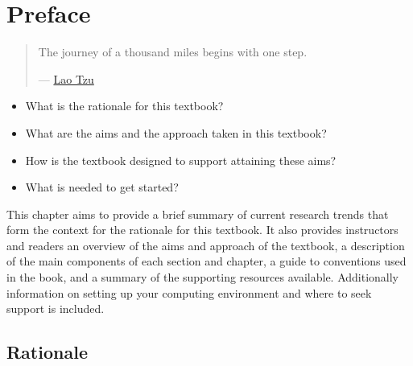 \documentclass[
  letterpaper,
]{latex/krantz}
\providecommand{\tightlist}{%
  \setlength{\itemsep}{0pt}\setlength{\parskip}{0pt}}\usepackage{longtable,booktabs,array}
\begin{document}

\hypertarget{sec-preface}{%
\chapter*{Preface}\label{sec-preface}}


\begin{quote}
The journey of a thousand miles begins with one step.

--- \href{https://en.wikipedia.org/wiki/Laozi}{Lao Tzu}
\end{quote}

\begin{tcolorbox}[enhanced jigsaw, toprule=.15mm, bottomtitle=1mm, coltitle=black, title=\textcolor{quarto-callout-note-color}{\faInfo}\hspace{0.5em}{Keys}, left=2mm, colframe=quarto-callout-note-color-frame, bottomrule=.15mm, colbacktitle=quarto-callout-note-color!10!white, leftrule=.75mm, colback=white, titlerule=0mm, breakable, toptitle=1mm, opacityback=0, arc=.35mm, rightrule=.15mm, opacitybacktitle=0.6]

\begin{itemize}
\tightlist
\item
  What is the rationale for this textbook?
\item
  What are the aims and the approach taken in this textbook?
\item
  How is the textbook designed to support attaining these aims?
\item
  What is needed to get started?
\end{itemize}

\end{tcolorbox}

This chapter aims to provide a brief summary of current research trends
that form the context for the rationale for this textbook. It also
provides instructors and readers an overview of the aims and approach of
the textbook, a description of the main components of each section and
chapter, a guide to conventions used in the book, and a summary of the
supporting resources available. Additionally information on setting up
your computing environment and where to seek support is included.

\hypertarget{rationale}{%
\section*{Rationale}\label{rationale}}
\end{document}

